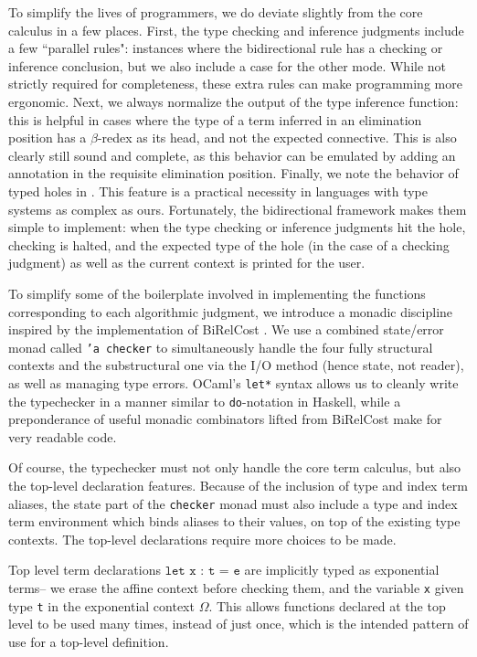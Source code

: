 To simplify the lives of programmers, we do deviate slightly from the core calculus in a few places. First, the type checking and inference judgments include a few ``parallel rules": instances where the bidirectional rule has a checking or inference conclusion, but we also include a case for the other mode. While not strictly required for completeness, these extra rules can make programming more ergonomic. Next, we always normalize the output of the type inference function: this is helpful in cases where the type of a term inferred in an elimination position has a $\beta$-redex as its head, and not the expected connective. This is also clearly still sound and complete, as this behavior can be emulated by adding an annotation in the requisite elimination position. Finally, we note the behavior of typed holes in \lambdaamorimpl. This feature is a practical necessity in languages with type systems as complex as ours. Fortunately, the bidirectional framework makes them simple to implement: when the type checking or inference judgments hit the hole, checking is halted, and the expected type of the hole (in the case of a checking judgment) as well as the current context is printed for the user.

To simplify some of the boilerplate involved in implementing the functions corresponding to each algorithmic judgment, we introduce a monadic discipline inspired by the implementation of BiRelCost \citehere. We use a combined state/error monad called \texttt{'a checker} to simultaneously handle the four fully structural contexts and the substructural one via the I/O method (hence state, not reader), as well as managing type errors. OCaml's \texttt{let*} syntax allows us to cleanly write the typechecker in a manner similar to \texttt{do}-notation in Haskell, while a preponderance of useful monadic combinators lifted from BiRelCost make for very readable code.

Of course, the typechecker must not only handle the core term calculus, but also the top-level declaration features. Because of the inclusion of type and index term aliases, the state part of the \texttt{checker} monad must also include a type and index term environment which binds aliases to their values, on top of the existing type contexts. The top-level declarations require more choices to be made. 

Top level term declarations $\texttt{let x : t = e}$ are implicitly typed as exponential terms-- we erase the affine context before checking them, and the variable \texttt{x} given type \texttt{t} in the exponential context $\Omega$. This allows functions declared at the top level to be used many times, instead of just once, which is the intended pattern of use for a top-level definition.

